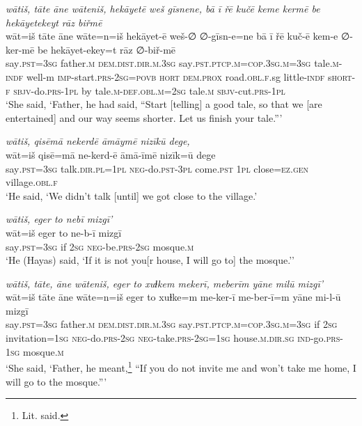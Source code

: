\ea \label{ŽH.27}
\textit{wātiš, tāte āne wāteniš, hekāyetē weš gīsnene, bā ī řē kučē keme kermē be hekāyetekeyt rāz biřmē} \\ 
\gll wāt=iš tāte āne wāte=n=iš hekāyet-ē weš-∅ ∅-gīsn-e=ne bā ī řē kuč-ē kem-e ∅-ker-mē be hekāyet-ekey=t rāz ∅-biř-mē \\ 
 say\textsc{.pst}\textsc{=3sg} father\textsc{.m} \textsc{dem.dist}\textsc{.dir}\textsc{.m}\textsc{.3sg} say\textsc{.pst}\textsc{.ptcp}\textsc{.m}\textsc{=cop}\textsc{.3sg}\textsc{.m}\textsc{=3sg} tale\textsc{.m}\textsc{-indf} well-m \textsc{imp-}start\textsc{.prs}-\textsc{2sg}\textsc{=\textsc{povb}} \textsc{hort} \textsc{dem.prox} road\textsc{.obl}\textsc{\textsc{.f}}.sg little\textsc{-indf} s\textsc{hort}\textsc{-f} \textsc{sbjv-}do\textsc{.prs}\textsc{-1pl} by tale\textsc{.m}\textsc{-def}\textsc{.obl}\textsc{.m}\textsc{=\textsc{2sg}} tale\textsc{.m} \textsc{sbjv-}cut\textsc{.prs}\textsc{-1pl} \\ 
\glt `She said, ‘Father, he had said, “Start [telling] a good tale, so that we [are entertained] and our way seems shorter. Let us finish your tale.”'
\z 
 
\ea \label{ŽH.30}
\textit{wātiš, qisēmā nekerdē āmāymē nizīkū dege,} \\ 
\gll wāt=iš qisē=mā ne-kerd-ē āmā-īmē nizīk=ū dege \\ 
 say\textsc{.pst}\textsc{=3sg} talk\textsc{.dir}\textsc{.pl}\textsc{=1pl} \textsc{neg-}do\textsc{.pst}\textsc{-3pl} come\textsc{.pst} \textsc{1pl} close\textsc{=ez}\textsc{.gen} village\textsc{.obl}\textsc{\textsc{.f}} \\ 
\glt `He said, ‘We didn’t talk [until] we got close to the village.'
\z 
 
\ea \label{ŽH.32}
\textit{wātiš, eger to nebī mizgī’} \\ 
\gll wāt=iš eger to ne-b-ī mizgī \\ 
 say\textsc{.pst}\textsc{=3sg} if \textsc{2sg} \textsc{neg-}be\textsc{.prs}-\textsc{2sg} mosque\textsc{.m} \\ 
\glt `He (Hayas) said, ‘If it is not you[r house, I will go to] the mosque.’'
\z 
 
\ea \label{ŽH.33}
\textit{wātiš, tāte, āne wāteniš, eger to xuɫkem mekerī, meberīm yāne milū mizgī’} \\ 
\gll wāt=iš tāte āne wāte=n=iš eger to xuɫke=m me-ker-ī me-ber-ī=m yāne mi-l-ū mizgī \\ 
 say\textsc{.pst}\textsc{=3sg} father\textsc{.m} \textsc{dem.dist}\textsc{.dir}\textsc{.m}\textsc{.3sg} say\textsc{.pst}\textsc{.ptcp}\textsc{.m}\textsc{=cop}\textsc{.3sg}\textsc{.m}\textsc{=3sg} if \textsc{2sg} invitation\textsc{=1sg} \textsc{neg-}do\textsc{.prs}-\textsc{2sg} \textsc{neg-}take\textsc{.prs}-\textsc{2sg}\textsc{=1sg} house\textsc{.m}\textsc{.dir.sg} \textsc{ind-}go\textsc{.prs}\textsc{-1sg} mosque\textsc{.m} \\ 
\glt `She said, ‘Father, he meant,\footnote{Lit. said.} “If you do not invite me and won’t take me home, I will go to the mosque.”'
\z 
 
